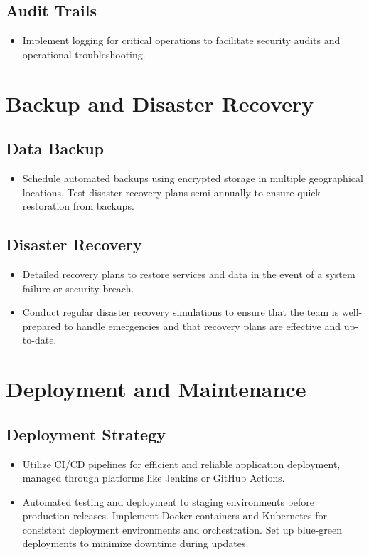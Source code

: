 \documentclass[11pt]{article}
\begin{document}
	\subsection*{Audit Trails}
	\begin{itemize}
		\item Implement logging for critical operations to facilitate security audits and operational troubleshooting.
	\end{itemize}
	
	\section*{Backup and Disaster Recovery}
	
	\subsection*{Data Backup}
	\begin{itemize}
		\item Schedule automated backups using encrypted storage in multiple geographical locations. Test disaster recovery plans semi-annually to ensure quick restoration from backups.
	\end{itemize}
	
	\subsection*{Disaster Recovery}
	\begin{itemize}
		\item Detailed recovery plans to restore services and data in the event of a system failure or security breach.
		\item Conduct regular disaster recovery simulations to ensure that the team is well-prepared to handle emergencies and that recovery plans are effective and up-to-date.
	\end{itemize}
	
	\section*{Deployment and Maintenance}
	
	\subsection*{Deployment Strategy}
	\begin{itemize}
		\item Utilize CI/CD pipelines for efficient and reliable application deployment, managed through platforms like Jenkins or GitHub Actions.
		\item Automated testing and deployment to staging environments before production releases. Implement Docker containers and Kubernetes for consistent deployment environments and orchestration. Set up blue-green deployments to minimize downtime during updates.
	\end{itemize}
	
\end{document}
